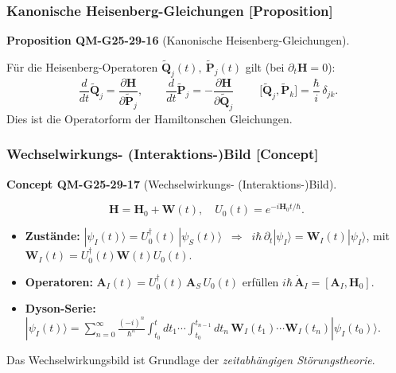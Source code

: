 \documentclass[10pt, letterpaper]{article}
\newcommand{\CustomHeading}[3]{%
  \par\medskip\noindent%
  \textbf{#1 #2} \textnormal{(#3)}.\enskip%
}
\newenvironment{PROP}[2]{\begin{unitbox}\CustomHeading{Proposition}{#1}{#2}}{\end{unitbox}}
\newenvironment{CONC}[2]{\begin{unitbox}\CustomHeading{Concept}{#1}{#2}}{\end{unitbox}}
\begin{document}

\subsubsection*{Kanonische Heisenberg-Gleichungen [Proposition]}

\begin{PROP}{QM-G25-29-16}{Kanonische Heisenberg-Gleichungen}
Für die Heisenberg-Operatoren
$\tilde{\mathbf Q}_j(t),\ \tilde{\mathbf P}_j(t)$
gilt (bei $\partial_t\mathbf H=0$):
\[
  \boxed{\;
    \frac{d}{dt}\tilde{\mathbf Q}_j=\frac{\partial\mathbf H}
                                           {\partial\tilde{\mathbf P}_j},
    \qquad
    \frac{d}{dt}\tilde{\mathbf P}_j=-\frac{\partial\mathbf H}
                                            {\partial\tilde{\mathbf Q}_j}
  \;}
  \qquad
  \bigl[\tilde{\mathbf Q}_j,\tilde{\mathbf P}_k\bigr]
  =\frac{\hbar}{i}\,\delta_{jk}.
\]
Dies ist die Operatorform der Hamiltonschen Gleichungen.
\end{PROP}


\subsubsection*{Wechselwirkungs- (Interaktions-)Bild [Concept]}

\begin{CONC}{QM-G25-29-17}{Wechselwirkungs- (Interaktions-)Bild}
\[
\mathbf H=\mathbf H_0+\mathbf W(t),
\quad
U_0(t)=e^{-i\mathbf H_0t/\hbar}.
\]

\begin{itemize}
\item \textbf{Zustände:}\;
      $|\psi_I(t)\rangle = U_0^\dagger(t)\,|\psi_S(t)\rangle
      \;\;\Longrightarrow\;\;
      i\hbar\,\partial_t|\psi_I\rangle=\mathbf W_I(t)|\psi_I\rangle$,
      mit  $\mathbf W_I(t)=U_0^\dagger(t)\mathbf W(t)U_0(t)$.

\item \textbf{Operatoren:}\;
      $\mathbf A_I(t)=U_0^\dagger(t)\,\mathbf A_S\,U_0(t)$
      erfüllen
      $i\hbar\,\dot{\mathbf A}_I=[\mathbf A_I,\mathbf H_0]$.

\item \textbf{Dyson-Serie:}\;
      $|\psi_I(t)\rangle=
       \displaystyle\sum_{n=0}^{\infty}
       \frac{(-i)^n}{\hbar^n}\!
       \int_{t_0}^t\!dt_1\!\cdots\!\int_{t_0}^{t_{n-1}}\!dt_n\,
       \mathbf W_I(t_1)\cdots\mathbf W_I(t_n)|\psi_I(t_0)\rangle$.
\end{itemize}

Das Wechselwirkungsbild ist Grundlage der \emph{zeitabhängigen
Störungstheorie}.
\end{CONC}
\end{document}
